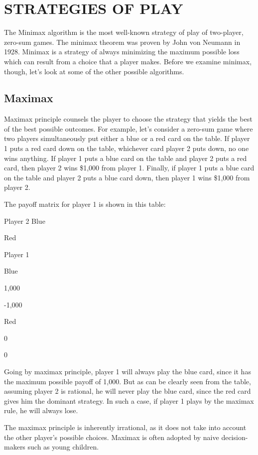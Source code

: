\documentclass[]{report}
\begin{document}

\section{STRATEGIES OF PLAY}
The Minimax algorithm is the most well-known strategy of play of two-player, zero-sum games. The minimax theorem was proven by John von Neumann in 1928. Minimax is a strategy of always minimizing the maximum possible loss which can result from a choice that a player makes. Before we examine minimax, though, let's look at some of the other possible algorithms.

\subsection{Maximax}

Maximax principle counsels the player to choose the strategy that yields the best of the best possible outcomes. For example, let's consider a zero-sum game where two players simultaneously put either a blue or a red card on the table. If player 1 puts a red card down on the table, whichever card player 2 puts down, no one wins anything. If player 1 puts a blue card on the table and player 2 puts a red card, then player 2 wins \$1,000 from player 1. Finally, if player 1 puts a blue card on the table and player 2 puts a blue card down, then player 1 wins \$1,000 from player 2.

The payoff matrix for player 1 is shown in this table:

Player 2
Blue

Red

Player 1  

Blue

1,000

-1,000

Red  

0

0

Going by maximax principle, player 1 will always play the blue card, since it has the maximum possible payoff of 1,000. But as can be clearly seen from the table, assuming player 2 is rational, he will never play the blue card, since the red card gives him the dominant strategy. In such a case, if player 1 plays by the maximax rule, he will always lose.

The maximax principle is inherently irrational, as it does not take into account the other player's possible choices. Maximax is often adopted by naive decision-makers such as young children.
\end{document}
